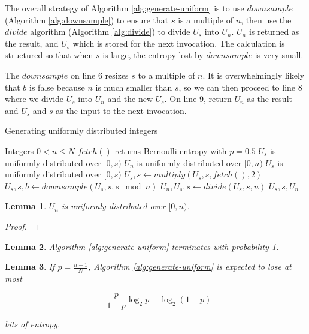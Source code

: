 \documentclass[12pt]{article}
\newtheorem{lemma}{Lemma}
\begin{document}
The overall strategy of Algorithm \ref{alg:generate-uniform} is to use $downsample$ (Algorithm \ref{alg:downsample}) to ensure that $s$ is a multiple of $n$, then use the $divide$ algorithm (Algorithm \ref{alg:divide}) to divide $U_s$ into $U_n$. $U_n$ is returned as the result, and $U_s$ which is stored for the next invocation. The calculation is structured so that when $s$ is large, the entropy lost by $downsample$ is very small.

The $downsample$ on line 6 resizes $s$ to a multiple of $n$. It is overwhelmingly likely that $b$ is false because $n$ is much smaller than $s$, so we can then proceed to line 8 where we divide $U_s$ into $U_n$ and the new $U_s$. On line 9, return $U_n$ as the result and $U_s$ and $s$ as the input to the next invocation.

\begin{algorithm}
\caption{Generating uniformly distributed integers}
\label{alg:generate-uniform}
\begin{algorithmic}[1]
\Require Integers $0 < n\le N$
\Require $fetch()$ returns Bernoulli entropy with $p=0.5$
\Require $U_s$ is uniformly distributed over $[0,s)$
\Ensure $U_n$ is uniformly distributed over $[0,n)$
\Ensure $U_s$ is uniformly distributed over $[0,s)$
        \State $U_s, s \gets multiply(U_s, s, fetch(), 2)$
    \EndWhile
    \State $U_s, s, b \gets downsample(U_s, s, s \mod n)$ 
        \State $U_n, U_s, s \gets divide(U_s, s, n)$
        \State \Return $U_s, s, U_n$
    \EndIf
  \EndWhile
\EndProcedure
\end{algorithmic}
\end{algorithm}

\begin{lemma}
$U_n$ is uniformly distributed over $[0,n)$.
\end{lemma}

\begin{proof}
\end{proof}

\begin{lemma}
Algorithm \ref{alg:generate-uniform} terminates with probability 1.
\end{lemma}

\begin{lemma}
    \label{lem:efficiencybinu}
If $p = \frac{n-1}{N}$, Algorithm \ref{alg:generate-uniform} is expected to lose at most

\begin{equation}
-\frac{p}{1-p}\log_2p - \log_2(1-p)
\end{equation}

bits of entropy.

\end{lemma}
\end{document}
